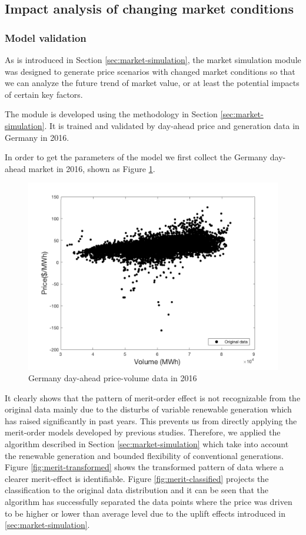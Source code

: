 \subsection{Impact analysis of changing market conditions}
\label{sec:impact-market-condition}

\subsubsection{Model validation}
As is introduced in Section \ref{sec:market-simulation}, the market simulation module was designed to generate price scenarios with changed market conditions so that we can analyze the future trend of market value, or at least the potential impacts of certain key factors. 

The module is developed using the methodology in Section \ref{sec:market-simulation}. It is trained and validated by day-ahead price and generation data in Germany in 2016. 

In order to get the parameters of the model we first collect the Germany day-ahead market in 2016, shown as Figure \ref{fig:merit-orignal}.

\begin{figure}[h!]
	\centering
	\includegraphics[width=0.95\linewidth]{Figures/Merit-order-original}
	\caption{Germany day-ahead price-volume data in 2016}
	\label{fig:merit-orignal}
\end{figure}

It clearly shows that the pattern of merit-order effect is not recognizable from the original data mainly due to the disturbs of variable renewable generation which has raised significantly in past years. This prevents us from directly applying the merit-order models developed by previous studies\cite{He2013}\cite{Grunewald2012a}. Therefore, we applied the algorithm described in Section \ref{sec:market-simulation} which take into account the renewable generation and bounded flexibility of conventional generations. Figure \ref{fig:merit-transformed} shows the transformed pattern of data where a clearer merit-effect is identifiable. Figure \ref{fig:merit-classified} projects the classification to the original data distribution and it can be seen that the algorithm has successfully separated the data points where the price was driven to be higher or lower than average level due to the uplift effects introduced in \ref{sec:market-simulation}. 

